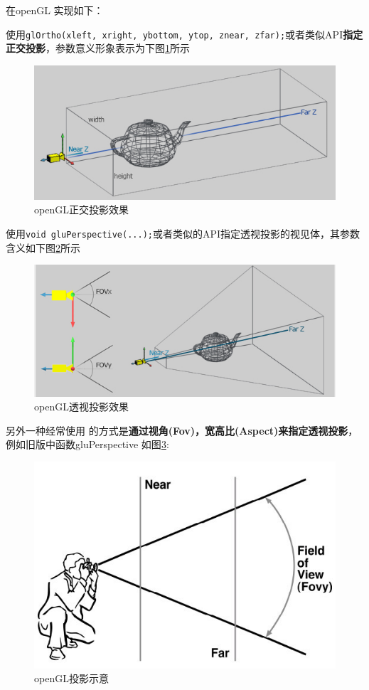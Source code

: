 \documentclass[UTF8,a4paper,12pt]{ctexbook}
\begin{document}
			在openGL 实现如下：
			
			使用\verb|glOrtho(xleft, xright, ybottom, ytop, znear, zfar);|或者类似API\textbf{指定正交投影}，参数意义形象表示为下图\ref{zhengjiao}所示
				\begin{figure}[htbp]
					\centering
					\includegraphics[scale = 0.7]{Ortho.png}
					\caption{openGL正交投影效果}
					\label{zhengjiao}
				\end{figure}
			
			使用\verb|void gluPerspective(...);|或者类似的API指定透视投影的视见体，其参数含义如下图\ref{toushi}所示
				\begin{figure}[htbp]
					\centering
					\includegraphics[scale = 0.7]{project3.png}
					\caption{openGL透视投影效果}
					\label{toushi}
				\end{figure}
				
			另外一种经常使用 的方式是\textbf{通过视角(Fov)，宽高比(Aspect)来指定透视投影}，例如旧版中函数gluPerspective 如图\ref{ts1}:
				\begin{figure}[htbp]
					\centering
					\includegraphics[scale = 0.7]{toushi.png}
					\caption{openGL投影示意}
					\label{ts1}
				\end{figure}
			
\end{document}
